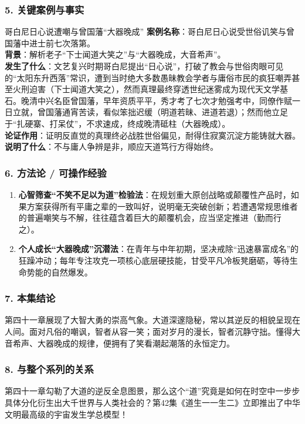 \subsubsection{5. 关键案例与事实}
\begin{CaseBox}{哥白尼日心说遭嘲与曾国藩“大器晚成”}
\textbf{案例名称}：哥白尼日心说受世俗讥笑与曾国藩中进士前七次落第。\\
\textbf{背景}：解析老子“下士闻道大笑之”与“大器晚成，大音希声”。\\
\textbf{发生了什么}：文艺复兴时期哥白尼提出“日心说”，打破了教会与世俗肉眼可见的“太阳东升西落”常识，遭到当时绝大多数愚昧教会学者与庸俗市民的疯狂嘲弄甚至火刑迫害（下士闻道大笑之），然而真理最终穿透世纪迷雾成为现代天文学基石。晚清中兴名臣曾国藩，早年资质平平，秀才考了七次才勉强考中，同僚作赋一日立就，曾国藩通宵苦读，看似笨拙迟缓（明道若昧、进道若退）；然而他立足于“扎硬寨、打呆仗”，不求速成，终成晚清砥柱（大器晚成）。\\
\textbf{论证作用}：证明反直觉的真理终必战胜世俗偏见，耐得住寂寞沉淀方能铸就大器。\\
\textbf{说明了什么}：不与庸人争辨是非，顺应天道笃行方得始终。
\end{CaseBox}

\subsubsection{6. 方法论 / 可操作经验}
\begin{enumerate}
    \item \textbf{心智筛查“不笑不足以为道”检验法}：在规划重大原创战略或颠覆性产品时，如果方案获得所有平庸之辈的一致叫好，说明毫无突破创新；若遭遇常规思维者的普遍嘲笑与不解，往往蕴含着巨大的颠覆机会，应当坚定推进（勤而行之）。
    \item \textbf{个人成长“大器晚成”沉潜法}：在青年与中年初期，坚决戒除“迅速暴富成名”的狂躁冲动；每年专注攻克一项核心底层硬技能，甘受平凡冷板凳磨砺，等待生命势能的自然爆发。
\end{enumerate}

\subsubsection{7. 本集结论}
第四十一章展现了大智大勇的崇高气象。大道深邃隐秘，常以其逆反的相貌呈现在人间。面对凡俗的嘲讽，智者从容一笑；面对岁月的漫长，智者沉静守拙。懂得大音希声、大器晚成的规律，便拥有了笑看潮起潮落的永恒定力。

\subsubsection{8. 与整个系列的关系}
第四十一章勾勒了大道的逆反全息图景，那么这个“道”究竟是如何在时空中一步步具体分化衍生出大千世界与人类社会的？第42集《道生一一生二》立即推出了中华文明最高级的宇宙发生学总模型！

